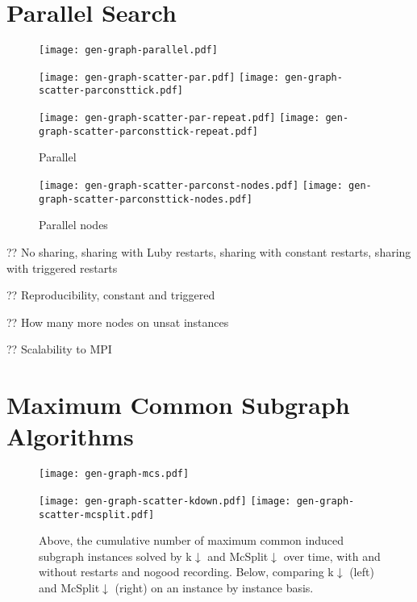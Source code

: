 \documentclass[runningheads]{llncs}
\begin{document}
\section{Parallel Search}

\begin{figure}[p]
    \centering
    \texttt{[image: gen-graph-parallel.pdf]}

    \medskip

    \texttt{[image: gen-graph-scatter-par.pdf]}
    \hfill
    \texttt{[image: gen-graph-scatter-parconsttick.pdf]}

    \medskip

    \texttt{[image: gen-graph-scatter-par-repeat.pdf]}
    \hfill
    \texttt{[image: gen-graph-scatter-parconsttick-repeat.pdf]}

    \caption{Parallel}\label{figure:parallel}
\end{figure}

\begin{figure}[tb]
    \texttt{[image: gen-graph-scatter-parconst-nodes.pdf]}
    \hfill
    \texttt{[image: gen-graph-scatter-parconsttick-nodes.pdf]}

    \caption{Parallel nodes}\label{figure:parallelnodes}
\end{figure}

?? No sharing, sharing with Luby restarts, sharing with constant restarts, sharing with triggered
restarts

?? Reproducibility, constant and triggered

?? How many more nodes on unsat instances

?? Scalability to MPI

\section{Maximum Common Subgraph Algorithms}

\begin{figure}[tb]
    \centering
    \texttt{[image: gen-graph-mcs.pdf]}

    \medskip

    \texttt{[image: gen-graph-scatter-kdown.pdf]}
    \hfill
    \texttt{[image: gen-graph-scatter-mcsplit.pdf]}

    \caption{Above, the cumulative number of maximum common induced subgraph instances solved by
    k${\downarrow}$ and McSplit${\downarrow}$ over time, with and without restarts and nogood
    recording. Below, comparing k${\downarrow}$ (left) and McSplit${\downarrow}$ (right) on an instance by instance
    basis.}\label{figure:mcs}
\end{figure}
\end{document}

